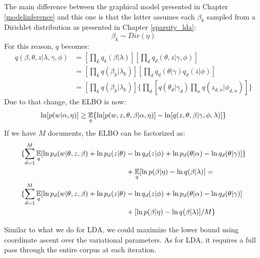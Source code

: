 The main difference between the graphical model presented in Chapter \ref{modelinference} and this one
is that the latter assumes each $\beta_k$ sampled from a Dirichlet distribution as presented in Chapter \ref{sparsity_lda}:
\begin{equation}
    \beta_k \sim Dir(\eta)
\end{equation}
For this reason, $q$ becomes:
\begin{equation*}
    \begin{split}
        q(\beta, \theta, z| \lambda, \gamma, \phi) & = [\prod_k q_k(\beta | \lambda)] [\prod_d q_d(\theta, z | \gamma, \phi)] \\
        & = [\prod_k q(\beta_k | \lambda_k)] [\prod_d q_d(\theta | \gamma) q_d(z | \phi)] \\
        & = [\prod_k q(\beta_k | \lambda_k)] \{\prod_d [q(\theta_d | \gamma_d) \prod_n q(z_{d,n} | \phi_{d,n})]\}
    \end{split}
\end{equation*}
Due to that change, the ELBO is now:
\begin{equation*}
    \ln [p(w | \alpha, \eta)] \geq \operatorname*{\mathbb{E}}_q\{ \ln [p(w, z, \theta, \beta | \alpha, \eta)] - \ln[q(z, \theta, \beta | \gamma, \phi, \lambda)] \}
\end{equation*}
If we have $M$ documents, the ELBO can be factorized as:
\begin{equation*}
    \begin{split}
        \{\sum_{d=1}^M \operatorname*{\mathbb{E}}_{q} [ \ln p_d(w | \theta, z, \beta) + \ln p_d(z | \theta) & - \ln q_d(z | \phi) + \ln p_d(\theta | \alpha) - \ln q_d(\theta | \gamma)]\} \\
        & + \operatorname*{\mathbb{E}}_q[\ln p(\beta | \eta) - \ln q(\beta | \lambda)] = \\
        \{\sum_{d=1}^M \operatorname*{\mathbb{E}}_{q} [ \ln p_d(w | \theta, z, \beta) + \ln p_d(z | \theta) & - \ln q_d(z | \phi) + \ln p_d(\theta | \alpha) - \ln q_d(\theta | \gamma)] \\
        & + [\ln p(\beta | \eta) - \ln q(\beta | \lambda)]/M \} \\
    \end{split}
\end{equation*}

Similar to what we do for LDA, we could maximize the lower bound using coordinate ascent over the variational parameters.
As for LDA, it requires a full pass through the entire corpus at each iteration.

